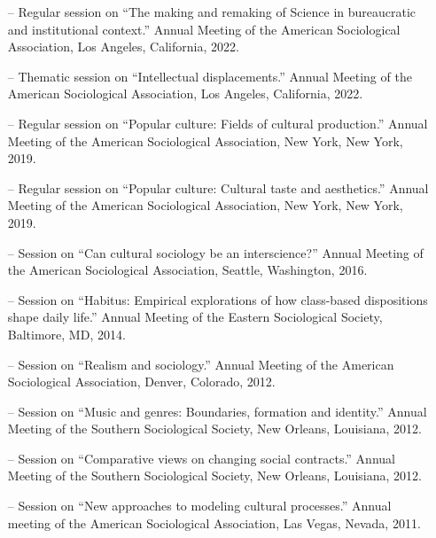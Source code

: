 
\begin{itemize}[itemsep=-0.5ex]
   \item[--] Regular session on ``The making and remaking of Science in bureaucratic and institutional context.'' Annual Meeting of the American Sociological Association, Los Angeles, California, 2022.
    
    \item[--] Thematic session on ``Intellectual displacements.'' Annual Meeting of the American Sociological Association, Los Angeles, California, 2022.
    
    \item[--] Regular session on ``Popular culture: Fields of cultural production.'' Annual Meeting of the American Sociological Association, New York, New York, 2019.
    
    \item[--] Regular session on ``Popular culture: Cultural taste and aesthetics.'' Annual Meeting of the American Sociological Association, New York, New York, 2019.
    
    \item[--] Session on  ``Can cultural sociology be an interscience?'' Annual Meeting of the American Sociological Association, Seattle, Washington, 2016.
    
    \item[--] Session on ``Habitus: Empirical explorations of how class-based dispositions shape daily life.'' Annual Meeting of the Eastern Sociological Society, Baltimore, MD, 2014.
    
    \item[--] Session on ``Realism and sociology.'' Annual Meeting of the American Sociological Association, Denver, Colorado, 2012.
    
    \item[--] Session on ``Music and genres: Boundaries, formation and identity.'' Annual Meeting of the Southern Sociological Society, New Orleans, Louisiana, 2012.
    
    \item[--] Session on ``Comparative views on changing social contracts.'' Annual Meeting of the Southern Sociological Society, New Orleans, Louisiana, 2012.
    
    \item[--] Session on ``New approaches to modeling cultural processes.'' Annual meeting of the American Sociological Association, Las Vegas, Nevada, 2011.
    

\end{itemize}
